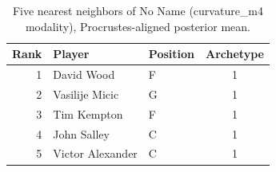\begin{table}[htbp]
  \centering\small
  \begin{tabular}{rllc}
    \toprule
    Rank & Player & Position & Archetype \\
    \midrule
    1 & David Wood & F & 1 \\
    2 & Vasilije Micic & G & 1 \\
    3 & Tim Kempton & F & 1 \\
    4 & John Salley & C & 1 \\
    5 & Victor Alexander & C & 1 \\
    \bottomrule
  \end{tabular}
  \caption{Five nearest neighbors of No Name (curvature_m4 modality), Procrustes-aligned posterior mean.}
  \label{tab:No_Name_neighbors_curvature_m4}
\end{table}

